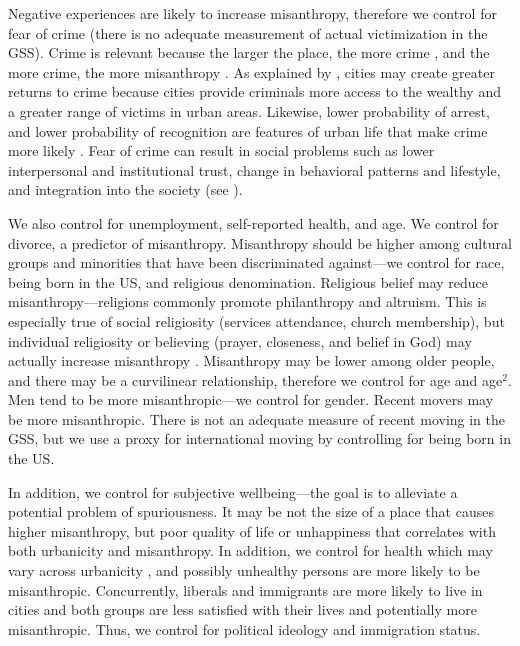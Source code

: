 \documentclass[11pt, letterpaper]{article}
\begin{document}
\begin{spacing}{1.4}
Negative experiences are likely to increase misanthropy, therefore we control
for fear of crime (there is no adequate measurement of actual victimization in
the GSS). Crime is relevant because the larger the place, the more crime
\citep{bettencourt10b,wirth38,white77}, and the more crime, the more misanthropy
\citep{wilson85}. As explained by \citet{glaeser1999}, cities may create greater
returns to crime because cities provide criminals more access to the wealthy and
a greater range of victims in urban areas. Likewise, lower probability of
arrest, and lower probability of recognition are features of urban life that
make crime more likely  \citet[see ][]{glaeser1999}. %
 Fear of crime can result in social problems such as lower interpersonal and institutional trust, change in behavioral patterns and lifestyle, and integration into the society (see \citet{krulichova2018life}). 

We also control for unemployment, self-reported health, and age. We control for
divorce, a predictor of misanthropy.  Misanthropy should be higher among
cultural groups and minorities that have been discriminated against---we control
for race, being born in the US, and religious denomination. Religious belief may
reduce misanthropy---religions commonly promote philanthropy and altruism. This
is especially true of social religiosity (services attendance, church
membership), but individual religiosity or believing (prayer, closeness, and
belief in God) may actually increase misanthropy \citep{aok20rel}. Misanthropy
may be lower among older people, and there may be a curvilinear relationship,
therefore we control for age and age$^2$. Men tend to be more misanthropic---we
control for gender. Recent movers may be more misanthropic. There is not an
adequate measure of recent moving in the GSS, but we use a proxy for international moving by controlling for being born in the US.

In addition, we control for subjective wellbeing---the goal is to alleviate a potential problem of spuriousness. It
may be not the size of a place that causes higher misanthropy, but %
poor quality of life or unhappiness \citep{aok21} that correlates with
both urbanicity and misanthropy.  %
 In addition, we control for health which may vary across urbanicity
 \citep[e.g.,][]{chen2019differences}, and  possibly unhealthy persons are more likely to be misanthropic.  
 Concurrently, liberals and immigrants are more likely to live in cities and both groups are less satisfied with their lives \citep{aok11a,aokJap14} and potentially more misanthropic. Thus, we control for political ideology and immigration status.


\end{spacing}
\end{document}
